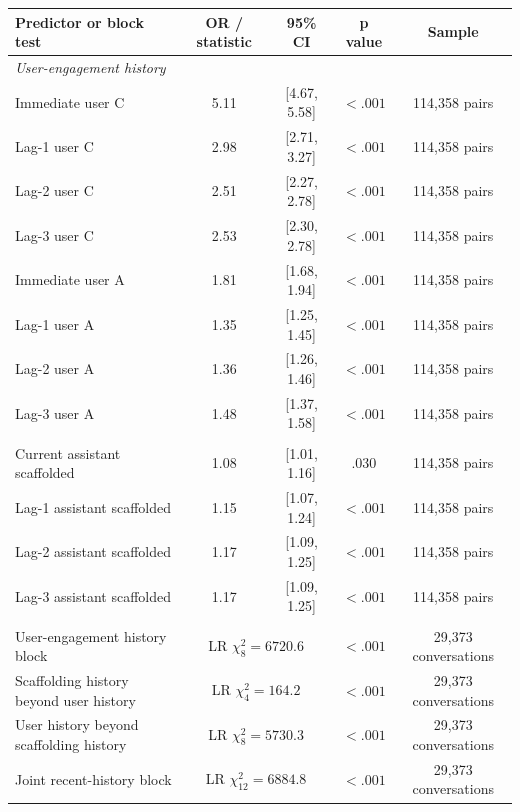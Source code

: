 \begin{table}[p]
{\begin{tabular}{lcccc}
Predictor or block test & OR / statistic & 95\% CI & p value & Sample \\
\midrule
\multicolumn{5}{l}{\textit{User-engagement history}} \\
Immediate user C & 5.11 & [4.67, 5.58] & $<.001$ & 114,358 pairs \\
Lag-1 user C & 2.98 & [2.71, 3.27] & $<.001$ & 114,358 pairs \\
Lag-2 user C & 2.51 & [2.27, 2.78] & $<.001$ & 114,358 pairs \\
Lag-3 user C & 2.53 & [2.30, 2.78] & $<.001$ & 114,358 pairs \\
Immediate user A & 1.81 & [1.68, 1.94] & $<.001$ & 114,358 pairs \\
Lag-1 user A & 1.35 & [1.25, 1.45] & $<.001$ & 114,358 pairs \\
Lag-2 user A & 1.36 & [1.26, 1.46] & $<.001$ & 114,358 pairs \\
Lag-3 user A & 1.48 & [1.37, 1.58] & $<.001$ & 114,358 pairs \\
\addlinespace[0.4ex]
\multicolumn{5}{l}{\textit{Assistant-scaffolding history}} \\
Current assistant scaffolded & 1.08 & [1.01, 1.16] & .030 & 114,358 pairs \\
Lag-1 assistant scaffolded & 1.15 & [1.07, 1.24] & $<.001$ & 114,358 pairs \\
Lag-2 assistant scaffolded & 1.17 & [1.09, 1.25] & $<.001$ & 114,358 pairs \\
Lag-3 assistant scaffolded & 1.17 & [1.09, 1.25] & $<.001$ & 114,358 pairs \\
\addlinespace[0.4ex]
\multicolumn{5}{l}{\textit{Block tests}} \\
User-engagement history block & \multicolumn{2}{c}{LR $\chi^2_{8}=6720.6$} & $<.001$ & 29,373 conversations \\
Scaffolding history beyond user history & \multicolumn{2}{c}{LR $\chi^2_{4}=164.2$} & $<.001$ & 29,373 conversations \\
User history beyond scaffolding history & \multicolumn{2}{c}{LR $\chi^2_{8}=5730.3$} & $<.001$ & 29,373 conversations \\
Joint recent-history block & \multicolumn{2}{c}{LR $\chi^2_{12}=6884.8$} & $<.001$ & 29,373 conversations \\
\bottomrule
\end{tabular}%
}
\end{table}

